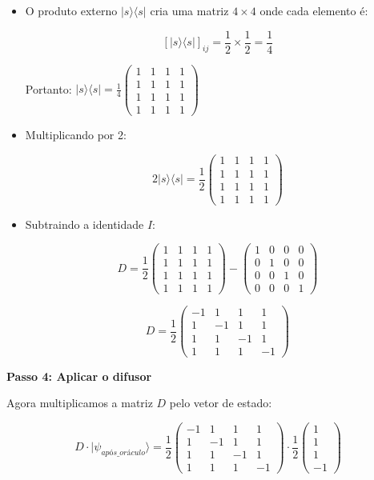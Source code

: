 \documentclass[
  brazilian,
]{report}
\begin{document}
\begin{itemize}
\item
  O produto externo \(|s\rangle\langle s|\) cria uma matriz
  \(4 \times 4\) onde cada elemento é:

  \[[|s\rangle\langle s|]_{ij} = \frac{1}{2} \times \frac{1}{2} = \frac{1}{4}\]

  Portanto:
  \(|s\rangle\langle s| = \frac{1}{4}\begin{pmatrix}1 & 1 & 1 & 1\\1 & 1 & 1 & 1\\1 & 1 & 1 & 1\\1 & 1 & 1 & 1\end{pmatrix}\)
\item
  Multiplicando por 2:

  \[2|s\rangle\langle s| = \frac{1}{2}\begin{pmatrix}1 & 1 & 1 & 1\\1 & 1 & 1 & 1\\1 & 1 & 1 & 1\\1 & 1 & 1 & 1\end{pmatrix}\]
\item
  Subtraindo a identidade \(I\):

  \[D = \frac{1}{2}\begin{pmatrix}1 & 1 & 1 & 1\\1 & 1 & 1 & 1\\1 & 1 & 1 & 1\\1 & 1 & 1 & 1\end{pmatrix} - \begin{pmatrix}1 & 0 & 0 & 0\\0 & 1 & 0 & 0\\0 & 0 & 1 & 0\\0 & 0 & 0 & 1\end{pmatrix}\]

  \[D = \frac{1}{2}\begin{pmatrix}-1 & 1 & 1 & 1\\1 & -1 & 1 & 1\\1 & 1 & -1 & 1\\1 & 1 & 1 & -1\end{pmatrix}\]
\end{itemize}

\textbf{Passo 4: Aplicar o difusor}

Agora multiplicamos a matriz \(D\) pelo vetor de estado:

\[D \cdot |\psi_{após\_oráculo}\rangle = \frac{1}{2}\begin{pmatrix}-1 & 1 & 1 & 1\\1 & -1 & 1 & 1\\1 & 1 & -1 & 1\\1 & 1 & 1 & -1\end{pmatrix} \cdot \frac{1}{2}\begin{pmatrix}1\\1\\1\\-1\end{pmatrix}\]
\end{document}
